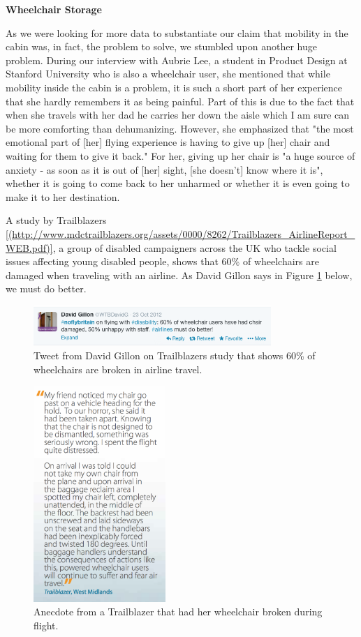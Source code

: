 \textbf{Wheelchair Storage}

As we were looking for more data to substantiate our claim that mobility in the cabin was, in fact, the problem to solve, we stumbled upon another huge problem. During our interview with Aubrie Lee, a student in Product Design at Stanford University who is also a wheelchair user, she mentioned that while mobility inside the cabin is a problem, it is such a short part of her experience that she hardly remembers it as being painful. Part of this is due to the fact that when she travels with her dad he carries her down the aisle which I am sure can be more comforting than dehumanizing. However, she emphasized that "the most emotional part of [her] flying experience is having to give up [her] chair and waiting for them to give it back." For her, giving up her chair is "a huge source of anxiety - as soon as it is out of [her] sight, [she doesn't] know where it is", whether it is going to come back to her unharmed or whether it is even going to make it to her destination. 

A study by Trailblazers \ref{(http://www.mdctrailblazers.org/assets/0000/8262/Trailblazers_AirlineReport_WEB.pdf)}, a group of disabled campaigners across the UK who tackle social issues affecting young disabled people, shows that 60\% of wheelchairs are damaged when traveling with an airline. As David Gillon says in Figure \ref{fig:60percenttweet.png} below, we must do better. 


\begin{figure}[h]
  \centering
     \includegraphics[width=9cm]{images/60percenttweet.png}
   \caption{Tweet from David Gillon on Trailblazers study that shows 60\% of wheelchairs are broken in airline travel. }
  \label{fig:60percenttweet.png}
\end{figure}

\begin{figure}[h]
  \centering
     \includegraphics[width=5cm]{images/wheelchairstory.png}
   \caption{Anecdote from a Trailblazer that had her wheelchair broken during flight.}
  \label{fig:wheelchairstory.png}
\end{figure}

